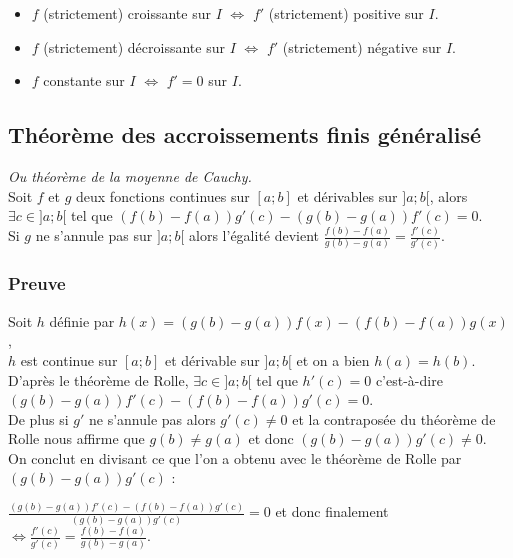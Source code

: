 \documentclass[a4paper,10pt]{book} %
\begin{document}
\begin{itemize}
\item $f$ (strictement) croissante sur $I$ $\Leftrightarrow$ $f'$ (strictement) positive sur $I$.
\item $f$ (strictement) décroissante sur $I$ $\Leftrightarrow$ $f'$ (strictement) négative sur $I$.
\item $f$ constante sur $I$ $\Leftrightarrow$ $f'=0$ sur $I$.
\end{itemize}

\subsection{Théorème des accroissements finis généralisé}
\emph{Ou théorème de la moyenne de Cauchy.}\\

Soit $f$ et $g$ deux fonctions continues sur $[a;b]$ et dérivables sur $]a;b[$, alors\\
$\exists c\in ]a;b[$ tel que $(f(b)-f(a))g'(c)-(g(b)-g(a))f'(c)=0$.\\

Si $g$ ne s'annule pas sur $]a;b[$ alors l'égalité devient $\frac{f(b)-f(a)}{g(b)-g(a)}=\frac{f'(c)}{g'(c)}$.

\subsubsection{Preuve}
\begin{spacing}{0.8} Soit $h$ définie par $h(x)=(g(b)-g(a))f(x)-(f(b)-f(a))g(x)$,\\
$h$ est continue sur $[a;b]$ et dérivable sur $]a;b[$ et on a bien $h(a)=h(b)$.\\

D'après le théorème de Rolle, $\exists c\in ]a;b[$ tel que $h'(c)=0$ c'est-à-dire\\
$(g(b)-g(a))f'(c)-(f(b)-f(a))g'(c)=0$.\\

De plus si $g'$ ne s'annule pas alors $g'(c)\neq 0$ et la contraposée du théorème de Rolle nous affirme que $g(b)\neq g(a)$ et donc $(g(b)-g(a))g'(c)\neq 0$.\\

On conclut en divisant ce que l'on a obtenu avec le théorème de Rolle par $(g(b)-g(a))g'(c)$ :
\begin{center} $\frac{(g(b)-g(a))f'(c)-(f(b)-f(a))g'(c)}{(g(b)-g(a))g'(c)}=0$ et donc finalement
$\Leftrightarrow \frac{f'(c)}{g'(c)}=\frac{f(b)-f(a)}{g(b)-g(a)}$. \end{center}\end{spacing}
\end{document}
